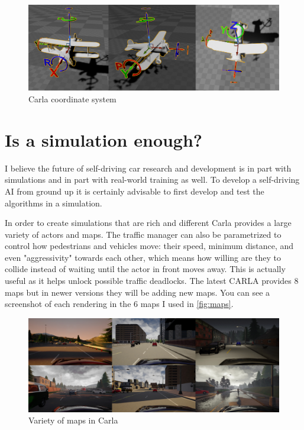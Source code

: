 \begin{figure}[!ht]
  \centering
  \includegraphics[width=150mm, keepaspectratio]{figures/carlacoords.jpg}
  \caption{Carla coordinate system}
  \label{fig:carlacoords}
\end{figure}


\section{Is a simulation enough?}
I believe the future of self-driving car research and development is in part
with simulations and in part with real-world training as well. To develop a
self-driving AI from ground up it is certainly advisable to first develop and
test the algorithms in a simulation. 

In order to create simulations that are rich and different Carla provides a
large variety of actors and maps. The traffic manager can also be parametrized
to control how pedestrians and vehicles move: their speed, minimum distance, and
even "aggressivity" towards each other, which means how willing are
they to collide instead of waiting until the actor in front moves away. This is
actually useful as it helps unlock possible traffic deadlocks. The latest
CARLA provides 8 maps but in newer versions they will be adding new maps. You
can see a screenshot of each rendering in the 6 maps I used in
\autoref{fig:maps}.

\begin{figure}[!ht]
  \centering
  \includegraphics[width=150mm, keepaspectratio]{figures/maps.jpg}
  \caption{Variety of maps in Carla}
  \label{fig:maps}
\end{figure}

